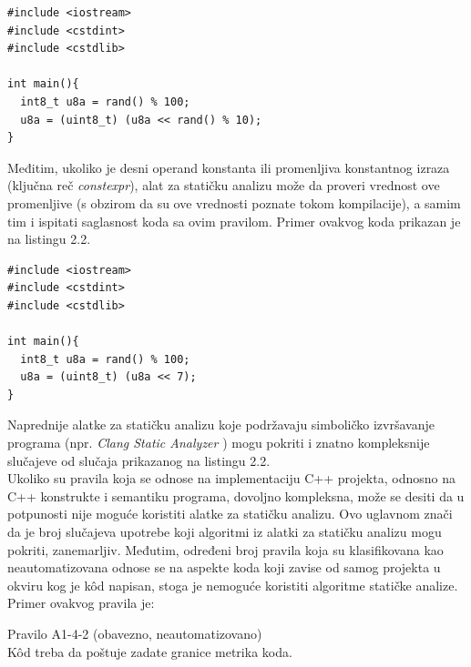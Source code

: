 \documentclass[12pt,oneside]{memoir}
\begin{document}
\begin{lstlisting}[style=customc, caption={K\^{o}d za koji stati\v{c}ka analiza u op\v{s}tem slu\v{c}aju ne mo\v{z}e da d\^{a} precizne rezultate.},label={lst:label1}]
#include <iostream>
#include <cstdint>
#include <cstdlib>

int main(){
  int8_t u8a = rand() % 100;
  u8a = (uint8_t) (u8a << rand() % 10);
}
\end{lstlisting}
Međitim, ukoliko je desni operand konstanta ili promenljiva konstantnog izraza (klju\v{c}na re\v{c} \textit{constexpr}), alat za stati\v{c}ku analizu mo\v{z}e da proveri vrednost ove promenljive (s obzirom da su ove vrednosti poznate tokom kompilacije), a samim tim i ispitati saglasnost koda sa ovim pravilom.
  Primer ovakvog koda prikazan je na listingu 2.2. \\

\begin{lstlisting}[style=customc, caption={K\^{o}d čija se ispravnost jednostavno može utvrditi statičkom analizom.},label={lst:label2}]
#include <iostream>
#include <cstdint>
#include <cstdlib>

int main(){
  int8_t u8a = rand() % 100;
  u8a = (uint8_t) (u8a << 7);
}
\end{lstlisting}

  Naprednije alatke za statičku analizu koje podržavaju simboličko izvršavanje programa (npr. \textit{Clang Static Analyzer} \cite{CSAWebsite}) mogu pokriti i znatno kompleksnije 
  slučajeve od slučaja prikazanog na listingu 2.2.
  \\
  \indent 
  Ukoliko su pravila koja se odnose na implementaciju C++ projekta, odnosno na C++ konstrukte i semantiku programa, dovoljno kompleksna, može se desiti da u potpunosti nije moguće koristiti alatke za statičku analizu. Ovo uglavnom znači da je broj slučajeva upotrebe koji algoritmi iz alatki za stati\v{c}ku analizu mogu pokriti, zanemarljiv. Međutim, određeni broj pravila koja su klasifikovana kao neautomatizovana odnose se na aspekte koda koji zavise od samog projekta
  u okviru kog je k\^{o}d napisan, stoga je nemoguće koristiti algoritme statičke analize.
  Primer ovakvog pravila je:

\begin{center}
\begin{tcolorbox}
Pravilo A1-4-2 (obavezno, neautomatizovano) \\
K\^{o}d treba da poštuje zadate granice metrika koda.
\end{tcolorbox}
\end{center}
\end{document}
